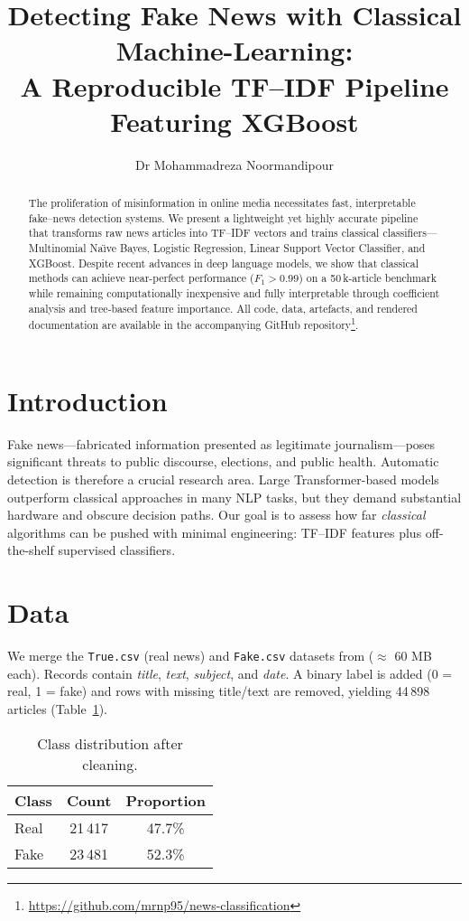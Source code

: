 \documentclass[11pt]{article}
\title{\bfseries Detecting Fake News with Classical Machine-Learning:\\
A Reproducible TF–IDF Pipeline Featuring XGBoost}
\author{Dr Mohammadreza Noormandipour}
\date{}
\begin{document}
\maketitle

\begin{abstract}
The proliferation of misinformation in online media necessitates fast, interpretable
fake–news detection systems.  
We present a lightweight yet highly accurate pipeline that transforms
raw news articles into TF–IDF vectors and trains classical classifiers—
Multinomial Na\"{\i}ve Bayes, Logistic Regression, Linear Support Vector
Classifier, and XGBoost.
Despite recent advances in deep language models, we show that
classical methods can achieve near-perfect performance ($F_1 > 0.99$) on a
50\,k-article benchmark while remaining computationally inexpensive and
fully interpretable through coefficient analysis and tree‐based feature
importance.  All code, data, artefacts, and rendered documentation
are available in the accompanying GitHub repository\footnote{\url{https://github.com/mrnp95/news-classification}}.
\end{abstract}

\section{Introduction}
Fake news—fabricated information presented as legitimate journalism—poses
significant threats to public discourse, elections, and public health.
Automatic detection is therefore a crucial research area.
Large Transformer-based models outperform classical approaches in many NLP
tasks, but they demand substantial hardware and obscure decision paths.
Our goal is to assess how far \emph{classical} algorithms can be pushed
with minimal engineering: TF–IDF features plus off-the-shelf
supervised classifiers.

\section{Data}
We merge the \texttt{True.csv} (real news) and \texttt{Fake.csv}
datasets from \cite{KaggleFake} ($\approx$ 60 MB each).
Records contain \emph{title}, \emph{text}, \emph{subject}, and
\emph{date}.  A binary label is added (0 = real, 1 = fake) and rows with
missing title/text are removed, yielding 44\,898 articles
(Table~\ref{tab:class-dist}).

\begin{table}[h]
\centering
\begin{tabular}{lcc}
\toprule
Class & Count & Proportion \\
\midrule
Real  & 21\,417 & 47.7\% \\
Fake  & 23\,481 & 52.3\% \\
\bottomrule
\end{tabular}
\caption{Class distribution after cleaning.}
\label{tab:class-dist}
\end{table}
\end{document}
